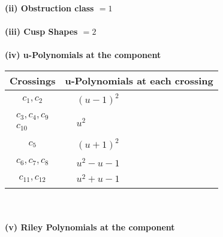 \documentclass[1p]{elsarticle_modified}
\theoremstyle{definition}
\begin{document}
\flushleft \textbf{(ii) Obstruction class $= 1$}\\~\\
\flushleft \textbf{(iii) Cusp Shapes $= 2$}\\~\\
\newpage\renewcommand{\arraystretch}{1}
\flushleft \textbf{(iv) u-Polynomials at the component}\newline \\
\begin{tabular}{m{50pt}|m{274pt}}
Crossings & \hspace{64pt}u-Polynomials at each crossing \\
\hline $$\begin{aligned}c_{1},c_{2}\end{aligned}$$&$\begin{aligned}
&(u-1)^2
\end{aligned}$\\
\hline $$\begin{aligned}c_{3},c_{4},c_{9}\\c_{10}\end{aligned}$$&$\begin{aligned}
&u^2
\end{aligned}$\\
\hline $$\begin{aligned}c_{5}\end{aligned}$$&$\begin{aligned}
&(u+1)^2
\end{aligned}$\\
\hline $$\begin{aligned}c_{6},c_{7},c_{8}\end{aligned}$$&$\begin{aligned}
&u^2- u-1
\end{aligned}$\\
\hline $$\begin{aligned}c_{11},c_{12}\end{aligned}$$&$\begin{aligned}
&u^2+u-1
\end{aligned}$\\
\hline
\end{tabular}\\~\\
\newpage\renewcommand{\arraystretch}{1}
\flushleft \textbf{(v) Riley Polynomials at the component}\newline \\
\end{document}
